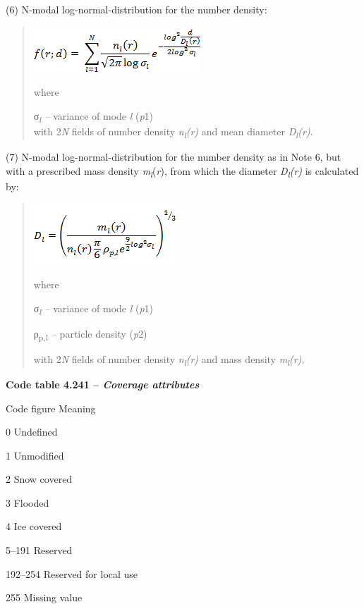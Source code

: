 (6) N-modal log-normal-distribution for the number density:

\begin{quote}
\includegraphics{../tex/extracted-media/media/image18.png}

where

σ\emph{\textsubscript{l} --} variance of mode \emph{l} (\emph{p}1)\\
with 2\emph{N} fields of number density \emph{n\textsubscript{l}(r)} and mean diameter \emph{D\textsubscript{l}(r)}.
\end{quote}

(7) N-modal log-normal-distribution for the number density as in Note 6, but with a prescribed mass density \emph{m\textsubscript{l}}(\emph{r}), from which the diameter \emph{D\textsubscript{l}(r)} is calculated by:

\begin{quote}
\includegraphics{../tex/extracted-media/media/image19.png}

where

σ\emph{\textsubscript{l} --} variance of mode \emph{l} (\emph{p}1)

ρ\textsubscript{p\emph{,}l} \emph{--} particle density (\emph{p}2)

with 2\emph{N} fields of number density \emph{n\textsubscript{l}(r)} and mass density \emph{m\textsubscript{l}(r).}
\end{quote}

\textbf{Code table 4.241 -- \emph{Coverage attributes}}

Code figure Meaning

0 Undefined

1 Unmodified

2 Snow covered

3 Flooded

4 Ice covered

5--191 Reserved

192--254 Reserved for local use

255 Missing value

